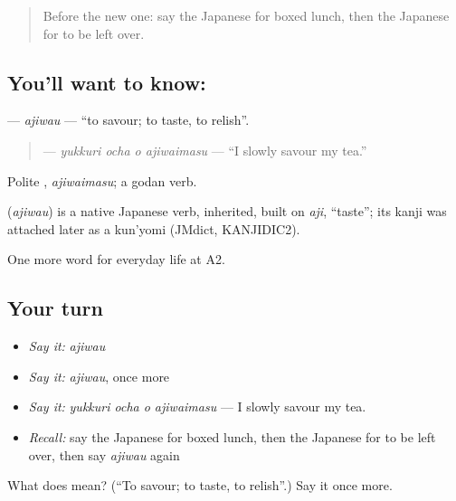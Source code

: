 \label{lesson:JA-C173-ajiwau}



\begin{quote}
Before the new one: say the Japanese for boxed lunch, then the Japanese for to be left over.
\end{quote}

\subsection*{You'll want to know: }
\textbf{} — \emph{ajiwau} — \textquotedblleft{}to savour; to taste, to relish\textquotedblright{}.

\begin{quote}
\textbf{  } — \emph{yukkuri ocha o ajiwaimasu} — \textquotedblleft{}I slowly savour my tea.\textquotedblright{}
\end{quote}

Polite \textbf{}, \emph{ajiwaimasu}; a godan verb.

\begin{cousinweb}
\textbf{} (\emph{ajiwau}) is a native Japanese verb, inherited, built on \emph{aji}, \textquotedblleft{}taste\textquotedblright{}; its kanji was attached later as a kun'yomi (JMdict, KANJIDIC2).
\end{cousinweb}

\begin{grammarlens}[title={What you've built}]
One more word for everyday life at A2.
\end{grammarlens}

\subsection*{Your turn}
\begin{itemize}
\raggedright
  \item \emph{Say it:} \emph{ajiwau}
  \item \emph{Say it:} \emph{ajiwau}, once more
  \item \emph{Say it:} \emph{yukkuri ocha o ajiwaimasu} — I slowly savour my tea.
  \item \emph{Recall:} say the Japanese for boxed lunch, then the Japanese for to be left over, then say \emph{ajiwau} again
\end{itemize}

\begin{tcolorbox}[breakable,colback=teal!4,colframe=teal!35!black,title={Before you move on}]
What does  mean? (\textquotedblleft{}To savour; to taste, to relish\textquotedblright{}.) Say it once more.
\end{tcolorbox}
